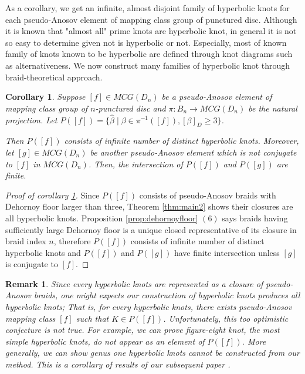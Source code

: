 \documentclass[12pt]{amsart}
\newtheorem{cor}{Corollary}
\newtheorem{rem}{Remark}}
\begin{document}
 As a corollary, we get an infinite, almost disjoint family of hyperbolic knots for each pseudo-Anosov element of mapping class group of punctured disc. Although it is known that "almost all" prime knots are hyperbolic knot, in general it is not so easy to determine given not is hyperbolic or not. Especially, most of known family of knots known to be hyperbolic are defined through knot diagrams such as alternativeness. We now construct many families of hyperbolic knot through braid-theoretical approach.
  
   

\begin{cor}
\label{cor:c1}
 Suppose $[f] \in MCG(D_{n})$ be a pseudo-Anosov element of mapping class group of $n$-punctured disc and $\pi: B_{n} \rightarrow MCG(D_{n})$ be the natural projection. Let $ P([f])=\{ \widehat{\beta} \;| \;\beta \in \pi^{-1} ([f]),[\beta]_{D} \geq 3 \} $. 

Then $P([f])$ consists of infinite number of distinct hyperbolic knots.
Moreover, let $[g] \in MCG(D_{n})$ be another pseudo-Anosov element which is not conjugate to $[f]$ in $MCG(D_{n})$.
Then, the intersection of $P([f])$ and $P([g])$ are finite. 

\end{cor}
\begin{proof}[Proof of corollary \ref{cor:c1}]
    Since $P([f])$ consists of pseudo-Anosov braids with Dehornoy floor larger than three, Theorem \ref{thm:main2} shows their closures are all hyperbolic knots. 
Proposition \ref{prop:dehornoyfloor} $(6)$ says braids having sufficiently large Dehornoy floor is a unique closed representative of its closure in braid index $n$, therefore $P([f])$ consists of infinite number of distinct hyperbolic knots and $P([f])$ and $P([g])$ have finite intersection unless $[g]$ is conjugate to $[f]$.
\end{proof}

\begin{rem}
   Since every hyperbolic knots are represented as a closure of pseudo-Anosov braids, one might expects our construction of hyperbolic knots produces {\it all} hyperbolic knots; That is, for every hyperbolic knots, there exists pseudo-Anosov mapping class $[f]$ such that $K \in P([f])$. Unfortunately, this too optimistic conjecture is not true.
   For example, we can prove figure-eight knot, the most simple hyperbolic knots, do not appear as an element of $P([f])$. More generally, we can show genus one hyperbolic knots cannot be constructed from our method. This is a corollary of results of our subsequent paper \cite{i}.
\end{rem}
\end{document}

